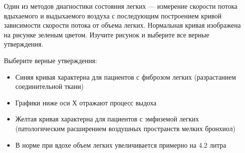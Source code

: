
Один из методов
диагностики состояния легких — измерение скорости потока вдыхаемого и
выдыхаемого воздуха с последующим построением кривой зависимости скорости
потока от объема легких. Нормальная кривая изображена на рисунке зеленым
цветом. Изучите рисунок и выберите все верные утверждения.


Выберите верные утверждения:

\begin{itemize}
    \item Синяя кривая характерна для пациентов с фиброзом легких (разрастанием соединительной ткани)
    \item Графики ниже оси Х отражают процесс выдоха
    \item Желтая кривая характерна для пациентов с эмфиземой легких (патологическим расширением воздушных пространств мелких бронхиол)
    \item В норме при вдохе объем легких увеличивается примерно на 4.2 литра
\end{itemize}

\explanationSection

